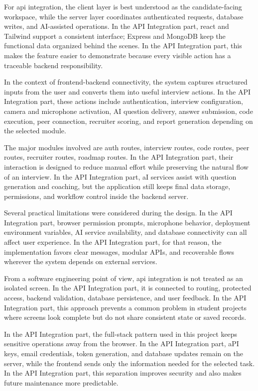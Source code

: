 \documentclass[12pt,a4paper]{report}
\begin{document}
For api integration, the client layer is best understood as the candidate-facing workspace, while the server layer coordinates authenticated requests, database writes, and AI-assisted operations. In the API Integration part, react and Tailwind support a consistent interface; Express and MongoDB keep the functional data organized behind the scenes. In the API Integration part, this makes the feature easier to demonstrate because every visible action has a traceable backend responsibility.


In the context of frontend-backend connectivity, the system captures structured inputs from the user and converts them into useful interview actions. In the API Integration part, these actions include authentication, interview configuration, camera and microphone activation, AI question delivery, answer submission, code execution, peer connection, recruiter scoring, and report generation depending on the selected module.


The major modules involved are auth routes, interview routes, code routes, peer routes, recruiter routes, roadmap routes. In the API Integration part, their interaction is designed to reduce manual effort while preserving the natural flow of an interview. In the API Integration part, aI services assist with question generation and coaching, but the application still keeps final data storage, permissions, and workflow control inside the backend server.


Several practical limitations were considered during the design. In the API Integration part, browser permission prompts, microphone behavior, deployment environment variables, AI service availability, and database connectivity can all affect user experience. In the API Integration part, for that reason, the implementation favors clear messages, modular APIs, and recoverable flows wherever the system depends on external services.


From a software engineering point of view, api integration is not treated as an isolated screen. In the API Integration part, it is connected to routing, protected access, backend validation, database persistence, and user feedback. In the API Integration part, this approach prevents a common problem in student projects where screens look complete but do not share consistent state or saved records.


In the API Integration part, the full-stack pattern used in this project keeps sensitive operations away from the browser. In the API Integration part, aPI keys, email credentials, token generation, and database updates remain on the server, while the frontend sends only the information needed for the selected task. In the API Integration part, this separation improves security and also makes future maintenance more predictable.
\end{document}
